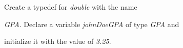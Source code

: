 Create a typedef for \textit{double} with the name

\textit{GPA}. Declare a variable \textit{johnDoeGPA} of type \textit{GPA} and

initialize it with the value of \textit{3.25}.

